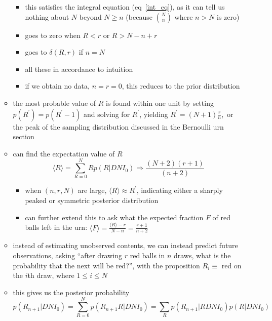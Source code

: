 \documentclass[../jaynes_prob_theory_notes.tex]{subfiles}
\begin{document}
\begin{itemize}
\begin{itemize}
\begin{itemize}
                        \item this satisfies the integral equation (eq~\ref{int_eq}), as it can tell us nothing about $N$ beyond $N \geq n$ (because $\binom{N}{n}$ where $n > N$ is zero)
                        \item goes to zero when $R < r$ or $R > N - n + r$
                        \item goes to $\delta(R,r)$ if $n = N$
                        \item all these in accordance to intuition
                        \item if we obtain no data, $n = r = 0$, this reduces to the prior distribution
                    \end{itemize}
                \item the most probable value of $R$ is found within one unit by setting $p(R^{\prime}) = p(R^{\prime} - 1)$ and solving for $R^{\prime}$, yielding $R^{\prime} = (N+1) \frac{r}{n}$,\ or the peak of the sampling distribution discussed in the Bernoulli urn section
                \item can find the expectation value of $R$
                    \begin{equation*}
                        \langle R \rangle = \sum^{N}_{R=0} Rp(R|DNI_0) \Rightarrow \frac{(N+2)(r+1)}{(n+2)}
                    \end{equation*}
                    \begin{itemize}
                        \item when $(n, r, N)$ are large, $\langle R \rangle \approx R^{\prime}$, indicating either a sharply peaked or symmetric posterior distribution
                        \item can further extend this to ask what the expected fraction $F$ of red balls left in the urn: $\langle F \rangle = \frac{\langle R \rangle - r}{N-n} = \frac{r+1}{n+2}$
                    \end{itemize}
                \item instead of estimating unobserved contents, we can instead predict future observations, asking ``after drawing $r$ red balls in $n$ draws, what is the probability that the next will be red?'', with the proposition $R_i \equiv$ red on the $i$th draw, where $1 \leq i \leq N$
                \item this gives us the posterior probability
                    \begin{equation*}
                        p(R_{n+1}|DNI_0) = \sum^{N}_{R=0}p(R_{n+1}R|DNI_0) = \sum_{R}p(R_{n+1}|RDNI_0)p(R|DNI_0)

\end{equation*}
\end{itemize}
\end{itemize}
\end{document}
